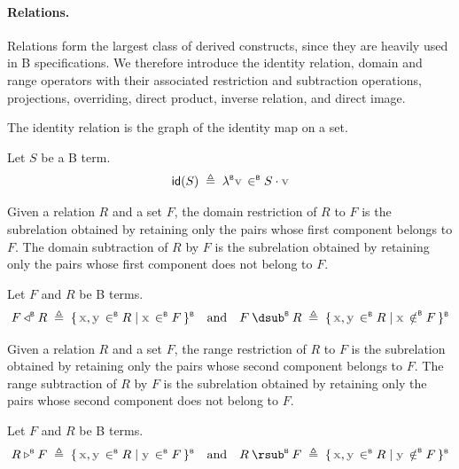 \paragraph{Relations.}
Relations form the largest class of derived constructs, since they are heavily
used in B specifications.
We therefore introduce the identity relation, domain and range operators with
their associated restriction and subtraction operations, projections,
overriding, direct product, inverse relation, and direct image.

The identity relation is the graph of the identity map on a set.
\begin{definition}
  \label{def:b-syntax-id}
  Let \(S\) be a B term.
  \[
    \mathsf{id}(S) \;\triangleq\; \lambdaB \var{v} \inB S \cdot \var{v}
  \]
\end{definition}

Given a relation \(R\) and a set \(F\), the domain restriction of \(R\) to
\(F\) is the subrelation obtained by retaining only the pairs whose first
component belongs to \(F\). The domain subtraction of \(R\) by \(F\) is the
subrelation obtained by retaining only the pairs whose first component does not
belong to \(F\).
\begin{definition}
  \label{def:b-syntax-domRestrSub}
      Let \(F\) and \(R\) be B terms.
  \[
    F \regnotation{\domRestrB} R \;\triangleq\; \bcomp{\var{x}, \var{y} \inB R}{\var{x} \inB F} \quad\text{and}\quad
    F \regnotation{\domSubtrB} R \;\triangleq\; \bcomp{\var{x}, \var{y} \inB R}{\var{x} \notinB F}
  \]
\end{definition}

Given a relation \(R\) and a set \(F\), the range restriction of \(R\) to \(F\)
is the subrelation obtained by retaining only the pairs whose second component
belongs to \(F\). The range subtraction of \(R\) by \(F\) is the subrelation
obtained by retaining only the pairs whose second component does not belong to
\(F\).
\begin{definition}
  \label{def:b-syntax-ranRestrSub}
      Let \(F\) and \(R\) be B terms.
  \[
    R \regnotation{\ranRestrB} F \;\triangleq\; \bcomp{\var{x}, \var{y} \inB R}{\var{y} \inB F} \quad\text{and}\quad
    R \regnotation{\ranSubtrB} F \;\triangleq\; \bcomp{\var{x}, \var{y} \inB R}{\var{y} \notinB F}
  \]
\end{definition}

